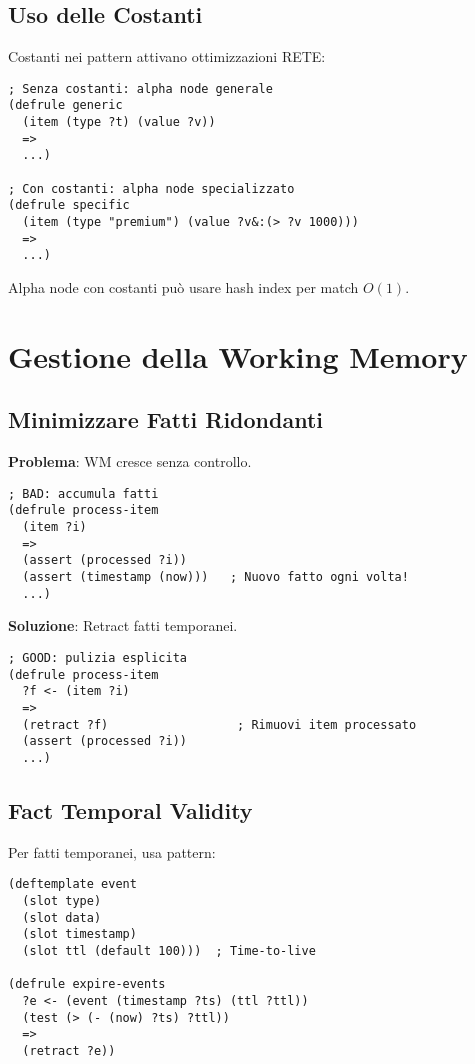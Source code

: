 \subsection{Uso delle Costanti}

Costanti nei pattern attivano ottimizzazioni RETE:

\begin{lstlisting}[language=CLIPS]
; Senza costanti: alpha node generale
(defrule generic
  (item (type ?t) (value ?v))
  =>
  ...)

; Con costanti: alpha node specializzato
(defrule specific
  (item (type "premium") (value ?v&:(> ?v 1000)))
  =>
  ...)
\end{lstlisting}

Alpha node con costanti può usare hash index per match $O(1)$.

\section{Gestione della Working Memory}

\subsection{Minimizzare Fatti Ridondanti}

\textbf{Problema}: WM cresce senza controllo.

\begin{lstlisting}[language=CLIPS]
; BAD: accumula fatti
(defrule process-item
  (item ?i)
  =>
  (assert (processed ?i))
  (assert (timestamp (now)))   ; Nuovo fatto ogni volta!
  ...)
\end{lstlisting}

\textbf{Soluzione}: Retract fatti temporanei.

\begin{lstlisting}[language=CLIPS]
; GOOD: pulizia esplicita
(defrule process-item
  ?f <- (item ?i)
  =>
  (retract ?f)                  ; Rimuovi item processato
  (assert (processed ?i))
  ...)
\end{lstlisting}

\subsection{Fact Temporal Validity}

Per fatti temporanei, usa pattern:

\begin{lstlisting}[language=CLIPS]
(deftemplate event
  (slot type)
  (slot data)
  (slot timestamp)
  (slot ttl (default 100)))  ; Time-to-live

(defrule expire-events
  ?e <- (event (timestamp ?ts) (ttl ?ttl))
  (test (> (- (now) ?ts) ?ttl))
  =>
  (retract ?e))
\end{lstlisting}

